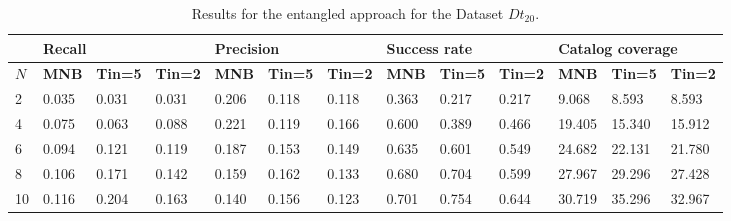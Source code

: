 \begin{table*}[]
	\small
	\caption{Results for the entangled approach for the Dataset $Dt_{20}$.}
	\begin{tabular}{|l | lll| lll |lll |lll|}
		\hline
		& \multicolumn{3}{l|}{\textbf{Recall}} & \multicolumn{3}{l|}{\textbf{Precision}} & \multicolumn{3}{l|}{\textbf{Success rate}} & \multicolumn{3}{l|}{ \textbf{Catalog coverage}} \\ \hline
		$N$  & \textbf{MNB}     & \textbf{Tin=5}   & \textbf{Tin=2}  & \textbf{MNB}      & \textbf{Tin=5 }   & \textbf{Tin=2}   & \textbf{MNB}       & \textbf{Tin=5 }   & \textbf{Tin=2}    & \textbf{MNB}        & \textbf{Tin=5 }     & \textbf{Tin=2}      \\ \hline
		2  & 0.035   & 0.031   & 0.031  & 0.206    & 0.118    & 0.118   & 0.363     & 0.217    & 0.217    & 9.068     & 8.593      & 8.593      \\ \hline
		4  & 0.075   & 0.063   & 0.088  & 0.221   & 0.119    & 0.166   &  0.600     & 0.389    & 0.466    & 19.405     & 15.340     & 15.912     \\ \hline
		6  & 0.094   & 0.121   & 0.119  & 0.187    & 0.153    & 0.149   & 0.635    & 0.601    & 0.549    &  24.682     & 22.131     & 21.780     \\ \hline
		\rowcolor{Gray}
		8  & 0.106   & 0.171   & 0.142  & 0.159  & 0.162    & 0.133   &  0.680     & 0.704    & 0.599    & 27.967     & 29.296     & 27.428     \\ \hline
		10 & 0.116   & 0.204   & 0.163  & 0.140    & 0.156    & 0.123   & 0.701     & 0.754    & 0.644    & 30.719     & 35.296     & 32.967     \\ \hline

\end{tabular}
\end{table*}
